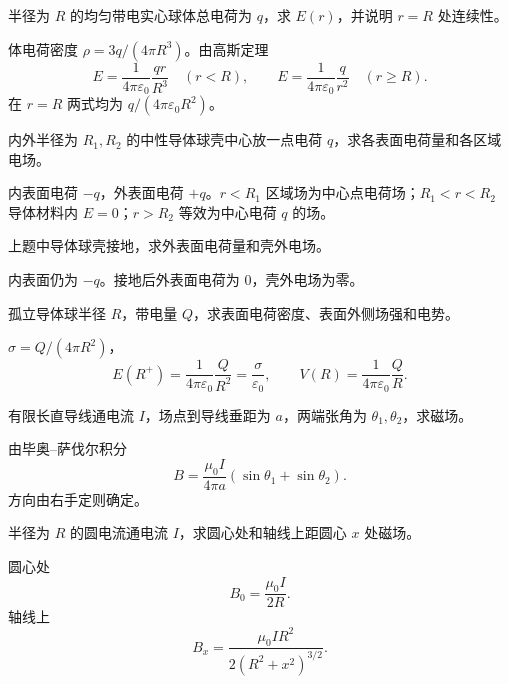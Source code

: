 \begin{exercise}[level=standard]
半径为 $R$ 的均匀带电实心球体总电荷为 $q$，求 $E(r)$，并说明 $r=R$ 处连续性。
\begin{solution}
体电荷密度 $\rho=3q/(4\pi R^3)$。由高斯定理
\[
  E=\frac{1}{4\pi\varepsilon_0}\frac{qr}{R^3}\quad(r<R),\qquad
  E=\frac{1}{4\pi\varepsilon_0}\frac{q}{r^2}\quad(r\ge R).
\]
在 $r=R$ 两式均为 $q/(4\pi\varepsilon_0R^2)$。
\end{solution}
\end{exercise}

\begin{exercise}[level=standard]
内外半径为 $R_1,R_2$ 的中性导体球壳中心放一点电荷 $q$，求各表面电荷量和各区域电场。
\begin{solution}
内表面电荷 $-q$，外表面电荷 $+q$。$r<R_1$ 区域场为中心点电荷场；$R_1<r<R_2$ 导体材料内 $E=0$；$r>R_2$ 等效为中心电荷 $q$ 的场。
\end{solution}
\end{exercise}

\begin{exercise}[level=standard]
上题中导体球壳接地，求外表面电荷量和壳外电场。
\begin{solution}
内表面仍为 $-q$。接地后外表面电荷为 $0$，壳外电场为零。
\end{solution}
\end{exercise}

\begin{exercise}[level=standard]
孤立导体球半径 $R$，带电量 $Q$，求表面电荷密度、表面外侧场强和电势。
\begin{solution}
$\sigma=Q/(4\pi R^2)$，
\[
  E(R^+)=\frac{1}{4\pi\varepsilon_0}\frac{Q}{R^2}=\frac{\sigma}{\varepsilon_0},
  \qquad
  V(R)=\frac{1}{4\pi\varepsilon_0}\frac{Q}{R}.
\]
\end{solution}
\end{exercise}

\begin{exercise}[level=standard]
有限长直导线通电流 $I$，场点到导线垂距为 $a$，两端张角为 $\theta_1,\theta_2$，求磁场。
\begin{solution}
由毕奥--萨伐尔积分
\[
  B=\frac{\mu_0I}{4\pi a}(\sin\theta_1+\sin\theta_2).
\]
方向由右手定则确定。
\end{solution}
\end{exercise}

\begin{exercise}[level=standard]
半径为 $R$ 的圆电流通电流 $I$，求圆心处和轴线上距圆心 $x$ 处磁场。
\begin{solution}
圆心处
\[
  B_0=\frac{\mu_0I}{2R}.
\]
轴线上
\[
  B_x=\frac{\mu_0IR^2}{2(R^2+x^2)^{3/2}}.
\]
\end{solution}
\end{exercise}

